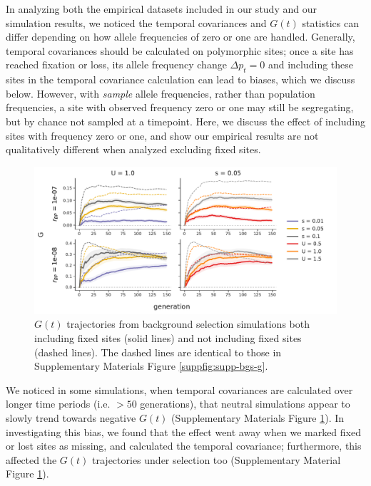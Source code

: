 \documentclass[11pt]{article}
\begin{document}
In analyzing both the empirical datasets included in our study and our
simulation results, we noticed the temporal covariances and $G(t)$ statistics
can differ depending on how allele frequencies of zero or one are handled.
Generally, temporal covariances should be calculated on polymorphic sites; once
a site has reached fixation or loss, its allele frequency change $\Delta p_t =
0$ and including these sites in the temporal covariance calculation can lead to
biases, which we discuss below. However, with \emph{sample} allele frequencies,
rather than population frequencies, a site with observed frequency zero or one
may still be segregating, but by chance not sampled at a timepoint. Here, we
discuss the effect of including sites with frequency zero or one, and show our
empirical results are not qualitatively different when analyzed excluding fixed
sites.


\begin{figure}[!ht]
  \centering
  \includegraphics[width=\textwidth]{figures/fig-bgs-G-with-fixations.pdf}

  \caption{$G(t)$ trajectories from background selection simulations both
  including fixed sites (solid lines) and not including fixed sites (dashed
lines). The dashed lines are identical to those in Supplementary Materials
Figure \ref{suppfig:supp-bgs-g}. }

  \label{suppfig:supp-bgs-g-fix}
\end{figure}

We noticed in some simulations, when temporal covariances are calculated over
longer time periods (i.e. $>50$ generations), that neutral simulations appear
to slowly trend towards negative $G(t)$ (Supplementary Materials Figure
\ref{suppfig:supp-bgs-g-fix}). In investigating this bias, we found that the
effect went away when we marked fixed or lost sites as missing, and calculated
the temporal covariance; furthermore, this affected the $G(t)$ trajectories
under selection too (Supplementary Material Figure
\ref{suppfig:supp-bgs-g-fix}). 
\end{document}
